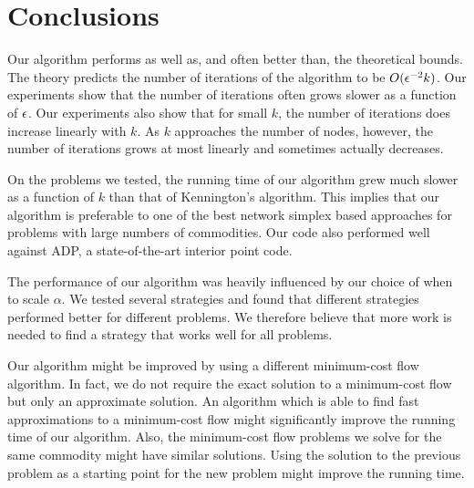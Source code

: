 \newcommand{\figinfoks}{$x$-axis is \# of commodity groups.\\
$y$-axis is $\#$ of iterations. \\
Each curve represents a set of runs on one of four different underlying graphs.
}
\newcommand{\figinfok}{$x$-axis is \# of commodity groups.\\
$y$-axis is $\#$ of iterations. \\
The curve represents a set of runs on one underlying graph.
}

\newpage
\section{Conclusions}

Our algorithm performs as well as, and often better than, the theoretical
bounds.  The theory predicts the number of iterations of the
algorithm to be $O(\epsilon^{-2} k)$. Our experiments show that the number
of
iterations often grows slower as a function of $\epsilon$.  Our experiments 
also show
that for small $k$, the number of iterations does increase linearly with
$k$.
As $k$ approaches the number of nodes, however,
the number of iterations grows at most linearly and sometimes actually
decreases.

On the problems we tested, the running time of our algorithm grew much
slower as a function of $k$ than that of Kennington's algorithm.  This implies
that our algorithm is preferable to one of the best network
simplex based approaches 
for problems with large numbers of commodities.    Our code also
performed well against ADP, a state-of-the-art interior point code.

The performance of our algorithm was heavily influenced by our choice of
when to scale $\alpha$.  We tested several strategies and found that
different strategies performed better for different problems.
We therefore believe
that more work is needed to find a strategy that works well for all problems.

Our algorithm might be improved by using a different minimum-cost flow
algorithm.  In fact, we do not require the exact solution to a
minimum-cost flow but only an approximate solution.  An algorithm which
is able to find fast approximations to a minimum-cost flow might
significantly improve the running time of our algorithm.  Also, the
minimum-cost flow problems we solve for the same commodity might have
similar solutions.  Using the solution to the previous problem as a
starting point for the new problem might improve the running time.

